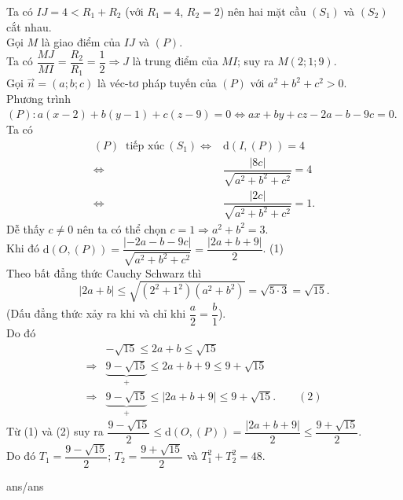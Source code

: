 \begin{ex}
{\begin{center}
		\end{center}
		Ta có $IJ=4< R_1+R_2$ (với $R_1=4$, $R_2=2$) nên hai mặt cầu $(S_1)$ và $(S_2)$ cắt nhau.\\
		Gọi $M$ là giao điểm của $IJ$ và $(P)$.\\
		Ta có $\dfrac{MJ}{MI}=\dfrac{R_2}{R_1}=\dfrac{1}{2} \Rightarrow J$ là trung điểm của $MI$; suy ra $M(2; 1; 9)$.\\
		Gọi $\overrightarrow{n}=(a;b;c)$ là véc-tơ pháp tuyến của $(P)$ với $a^2+b^2+c^2> 0$.\\
		Phương trình $(P)\colon a(x-2)+b(y-1)+c(z-9)=0\Leftrightarrow ax+by+cz-2a-b-9c=0$.\\
		Ta có 
		\allowdisplaybreaks
		\begin{align*}		
			(P)~\text{ tiếp xúc}~ (S_1)\Leftrightarrow& \mathrm{d}\left(I,(P)\right)=4
			\\
			\Leftrightarrow& \dfrac{|8c|}{\sqrt{a^2+b^2+c^2}}=4
			\\
			\Leftrightarrow& \dfrac{|2c|}{\sqrt{a^2+b^2+c^2}}=1.
		\end{align*}
		Dễ thấy $c\ne 0$ nên ta có thể chọn $c=1\Rightarrow a^2+b^2=3$.\\
		Khi đó $\mathrm{d}\left(O, (P)\right)=\dfrac{|-2a-b-9c|}{\sqrt{a^2+b^2+c^2}}=\dfrac{|2a+b+9|}{2}$. \qquad(1)\\
		Theo bất đẳng thức Cauchy Schwarz thì $$|2a+b|\le \sqrt{\left(2^2+1^2\right)\left(a^2+b^2\right)}=\sqrt{5\cdot 3}=\sqrt{15}.$$
		(Dấu đẳng thức xảy ra khi và chỉ khi $\dfrac{a}{2}=\dfrac{b}{1}$).\\
		Do đó 
		\begin{align*}
			&-\sqrt{15} \le 2a+b\le \sqrt{15}\\
			\Rightarrow& \underbrace{9-\sqrt{15}}_{+}\le 2a+b+9\le 9+\sqrt{15}
			\\
			\Rightarrow& \underbrace{9-\sqrt{15}}_{+}\le \left|2a+b+9\right|\le 9+\sqrt{15}. \qquad(2)
		\end{align*}
		Từ (1) và (2) suy ra $\dfrac{9-\sqrt{15}}{2} \le \mathrm{d}\left(O, (P)\right)=\dfrac{\left|2a+b+9\right|}{2} \le \dfrac{9+\sqrt{15}}{2}$.\\
		Do đó $T_1=\dfrac{9-\sqrt{15}}{2}$; $T_2=\dfrac{9+\sqrt{15}}{2}$ và $T_1^2+T_2^2=48$.
	}
\end{ex}

\begin{indapan}{ans/ans\currfilebase}\end{indapan}